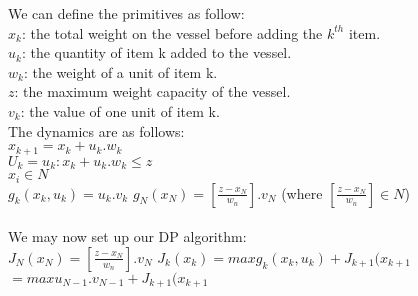 \documentclass[11pt, english]{article}
\begin{document}
We can define the primitives as follow:\\
$x_k$: the total weight on the vessel before adding the $k^{th}$ item.\\
$u_k$: the quantity of item k added to the vessel.\\
$w_k$: the weight of a unit of item k.\\
$z$: the maximum weight capacity of the vessel.\\
$v_k$: the value of one unit of item k.
\\
The dynamics are as follows:\\
$x_{k+1} = x_k + u_k.w_k$\\
$U_k = {u_k: x_k + u_k.w_k \leq z}$\\
$x_i \in N$\\
$g_k(x_k, u_k) = u_k.v_k$
$g_N(x_N) =[\frac{z - x_N}{w_n}].v_N$ (where $[\frac{z - x_N}{w_n}] \in N$)\\
\\
We may now set up our DP algorithm:\\
$J_N(x_N) = [\frac{z - x_N}{w_n}].v_N$
$J_k(x_k) = max{g_k(x_k, u_k) + J_{k+1}(x_{k+1}}$\\
	$= max{u_{N-1}.v_{N-1} + J_{k+1}(x_{k+1}}$\\
\end{document}
